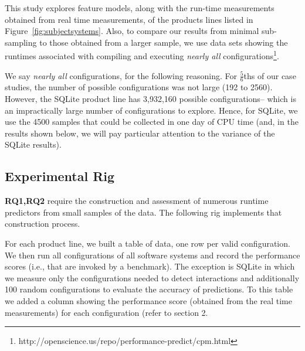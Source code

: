 \documentclass{sig-alternative}
\newcommand{\fig}[1]{Figure~\ref{fig:#1}}
\begin{document}
This study explores feature models, along with the run-time measurements obtained from real time measurements, of the products lines listed in \fig{subjectsystems}.
Also, to compare our results from minimal sub-sampling to those obtained 
from a larger sample, we use data sets showing the runtimes associated with
compiling and executing {\em nearly all} configurations\footnote{http://openscience.us/repo/performance-predict/cpm.html}.

We say {\em nearly all} configurations, for the following reasoning. For 
$\frac{5}{6}$ths of our case studies, the number of possible configurations
was not large (192 to 2560). However, the SQLite product line has 3,932,160 
possible configurations-- which is an impractically large number of configurations to explore. Hence, for SQLite, we use the 4500 samples that could
be collected in one day of CPU time (and, in the results shown below,
we will pay particular attention to the variance of the SQLite results).

\subsection{Experimental Rig}


{\bf RQ1,RQ2} require the construction and assessment of numerous runtime predictors from small samples
of the data. The following rig implements that construction process.

For each product line, we built a table of data, one row per valid configuration. We then run all configurations of all software systems
and record the performance scores (i.e., that are invoked by a benchmark).
The exception is SQLite in which we measure only the
configurations needed to detect interactions and additionally
100 random configurations to evaluate the accuracy of
predictions.  
To this table we added a column showing the performance score (obtained from the real time measurements) for each configuration (refer to section 2.
\end{document}
